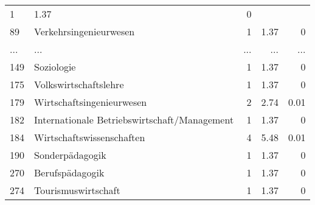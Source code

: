\begin{longtable}{lXrrr}
          \num{1} &
          \num[round-mode=places,round-precision=2]{1,37} &
          \num[round-mode=places,round-precision=2]{0} \\
        89 & \multicolumn{1}{X}{Verkehrsingenieurwesen} & %
          \num{1} &
          \num[round-mode=places,round-precision=2]{1,37} &
          \num[round-mode=places,round-precision=2]{0} \\
       ... & ... & ... & ... & ... \\
        149 & \multicolumn{1}{X}{Soziologie} & %
          \num{1} &
          \num[round-mode=places,round-precision=2]{1,37} &
          \num[round-mode=places,round-precision=2]{0} \\

        175 & \multicolumn{1}{X}{Volkswirtschaftslehre} & %
          \num{1} &
          \num[round-mode=places,round-precision=2]{1,37} &
          \num[round-mode=places,round-precision=2]{0} \\

        179 & \multicolumn{1}{X}{Wirtschaftsingenieurwesen} & %
          \num{2} &
          \num[round-mode=places,round-precision=2]{2,74} &
          \num[round-mode=places,round-precision=2]{0,01} \\

        182 & \multicolumn{1}{X}{Internationale Betriebswirtschaft/Management} & %
          \num{1} &
          \num[round-mode=places,round-precision=2]{1,37} &
          \num[round-mode=places,round-precision=2]{0} \\

        184 & \multicolumn{1}{X}{Wirtschaftswissenschaften} & %
          \num{4} &
          \num[round-mode=places,round-precision=2]{5,48} &
          \num[round-mode=places,round-precision=2]{0,01} \\

        190 & \multicolumn{1}{X}{Sonderpädagogik} & %
          \num{1} &
          \num[round-mode=places,round-precision=2]{1,37} &
          \num[round-mode=places,round-precision=2]{0} \\

        270 & \multicolumn{1}{X}{Berufspädagogik} & %
          \num{1} &
          \num[round-mode=places,round-precision=2]{1,37} &
          \num[round-mode=places,round-precision=2]{0} \\

        274 & \multicolumn{1}{X}{Tourismuswirtschaft} & %
          \num{1} &
          \num[round-mode=places,round-precision=2]{1,37} &
          \num[round-mode=places,round-precision=2]{0} \\


\end{longtable}
